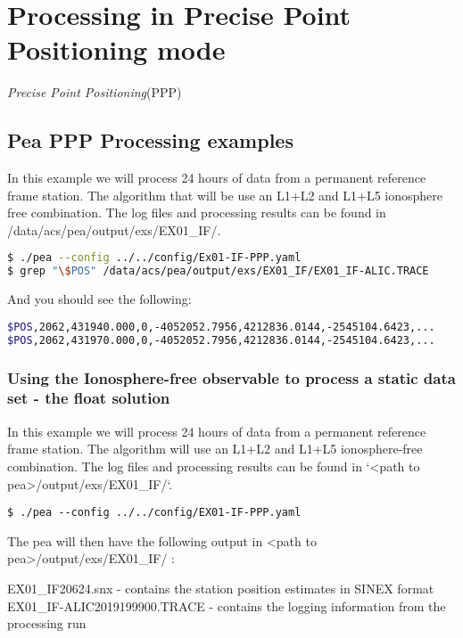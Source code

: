 \chapter{Processing in Precise Point Positioning mode}

\textit{Precise Point Positioning}(PPP)

\section{Pea PPP Processing examples}
In this example we will process 24 hours of data from a permanent reference frame station. The algorithm that will be use an L1+L2 and L1+L5 ionosphere free combination. The log files and processing results can be found in /data/acs/pea/output/exs/EX01\_IF/.

\begin{lstlisting}[language=bash]
$ ./pea --config ../../config/Ex01-IF-PPP.yaml
$ grep "\$POS" /data/acs/pea/output/exs/EX01_IF/EX01_IF-ALIC.TRACE
\end{lstlisting}

And you should see the following: 
\begin{lstlisting}[language=bash] 
$POS,2062,431940.000,0,-4052052.7956,4212836.0144,-2545104.6423,...
$POS,2062,431970.000,0,-4052052.7956,4212836.0144,-2545104.6423,...
\end{lstlisting}


\subsection{Using the Ionosphere-free observable to process a static data set - the float solution}

In this example we will process 24 hours of data from a permanent reference frame station. The algorithm will use an L1+L2 and L1+L5 ionosphere-free combination.
The log files and processing results can be found in `<path to pea>/output/exs/EX01\_IF/`.
\begin{lstlisting}
$ ./pea --config ../../config/EX01-IF-PPP.yaml
\end{lstlisting}
The pea will then have the following output in <path to pea>/output/exs/EX01\_IF/ :

EX01\_IF20624.snx              - contains the station position estimates in SINEX format
EX01\_IF-ALIC2019199900.TRACE  - contains the logging information from the processing run

